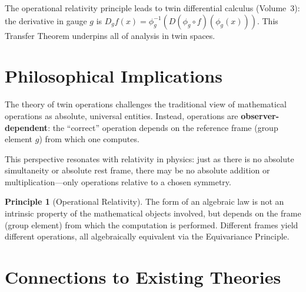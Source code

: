 \documentclass[11pt,a4paper,openany]{book}
\theoremstyle{plain}
\theoremstyle{definition}
\newtheorem{principle}[theorem]{Principle}
\begin{document}
\begin{connectionbox}
The operational relativity principle leads to twin differential calculus (Volume~3): the derivative in gauge $g$ is $D_g f(x) = \phi_g^{-1}(D(\phi_g \circ f)(\phi_g(x)))$. This Transfer Theorem underpins all of analysis in twin spaces.
\end{connectionbox}

\section{Philosophical Implications}

The theory of twin operations challenges the traditional view of mathematical operations as absolute, universal entities. Instead, operations are \textbf{observer-dependent}: the ``correct'' operation depends on the reference frame (group element $g$) from which one computes.

This perspective resonates with relativity in physics: just as there is no absolute simultaneity or absolute rest frame, there may be no absolute addition or multiplication---only operations relative to a chosen symmetry.

\begin{principle}[Operational Relativity]\label{prin:op-rel}
The form of an algebraic law is not an intrinsic property of the mathematical objects involved, but depends on the frame (group element) from which the computation is performed. Different frames yield different operations, all algebraically equivalent via the Equivariance Principle.
\end{principle}

\section{Connections to Existing Theories}
\end{document}
